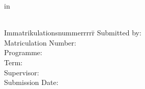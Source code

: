 \begin{centering}
		\Large \textbf{\Institution}\\
		\Large \Programme \\
		\vfill
		\LARGE \textbf{\Title} \\
		\Subtitle \\
		\vfill
		\LARGE \AsssignmentName \\ %
		\Large in \\
		\LARGE  \Class \\
		\vfill
		\begin{small}
			\begin{doublespace}
				\begin{tabbing}
					Immatrikulationsnummerrrrr\=\kill
					Submitted by:\>\Name\\
					Matriculation Number:\>\MatrikelNummer\\
					Programme:\>\Programme\\
					Term:\>\Semester\\
					Supervisor:\>\Supervisor\\
					Submission Date:\>\Date
				\end{tabbing}
			\end{doublespace}
		\end{small}
		
	\end{centering}\vspace{1cm}